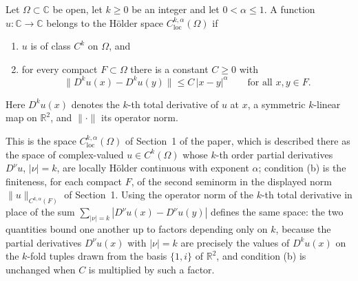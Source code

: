 \begin{definition}
Let $\Omega\subset\mathbb{C}$ be open, let $k\ge0$ be an integer and let
$0<\alpha\le1$.  A function $u\colon\mathbb{C}\to\mathbb{C}$ belongs to the
H\"older space $C^{k,\alpha}_{\mathrm{loc}}(\Omega)$ if
\begin{enumerate}
\item[(a)] $u$ is of class $C^k$ on $\Omega$, and
\item[(b)] for every compact $F\subset\Omega$ there is a constant $C\ge0$ with
\[
  \bigl\|D^ku(x)-D^ku(y)\bigr\|\le C\,|x-y|^\alpha
  \qquad\text{for all }x,y\in F .
\]
\end{enumerate}
Here $D^ku(x)$ denotes the $k$-th total derivative of $u$ at $x$, a symmetric
$k$-linear map on $\mathbb{R}^2$, and $\|\cdot\|$ its operator norm.

This is the space $C^{k,\alpha}_{\mathrm{loc}}(\Omega)$ of Section~1 of the
paper, which is described there as the space of complex-valued $u\in
C^k(\Omega)$ whose $k$-th order partial derivatives $D^\nu u$, $|\nu|=k$, are
locally H\"older continuous with exponent $\alpha$; condition (b) is the
finiteness, for each compact $F$, of the second seminorm in the displayed
norm $\|u\|_{C^{k,\alpha}(F)}$ of Section~1.  Using the operator norm of the
$k$-th total derivative in place of the sum
$\sum_{|\nu|=k}|D^\nu u(x)-D^\nu u(y)|$ defines the same space: the two
quantities bound one another up to factors depending only on $k$, because the
partial derivatives $D^\nu u(x)$ with $|\nu|=k$ are precisely the values of
$D^ku(x)$ on the $k$-fold tuples drawn from the basis $\{1,i\}$ of
$\mathbb{R}^2$, and condition (b) is unchanged when $C$ is multiplied by such
a factor.
\end{definition}
